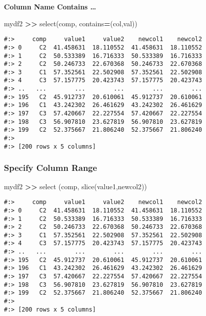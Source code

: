 \documentclass[
]{book}
\newenvironment{Shaded}{\begin{snugshade}}{\end{snugshade}}
\newcommand{\BuiltInTok}[1]{#1}
\newcommand{\NormalTok}[1]{#1}
\newcommand{\OperatorTok}[1]{\textcolor[rgb]{0.43,0.43,0.43}{\textbf{#1}}}
\newcommand{\StringTok}[1]{\textcolor[rgb]{0.5,0.5,0.5}{#1}}
\begin{document}
\textbf{Column Name Contains \ldots{}}

\begin{Shaded}
\begin{Highlighting}[]
\NormalTok{mydf2 }\OperatorTok{\textgreater{}\textgreater{}}\NormalTok{ select(}\StringTok{\textquotesingle{}comp\textquotesingle{}}\NormalTok{, contains}\OperatorTok{=}\NormalTok{(}\StringTok{\textquotesingle{}col\textquotesingle{}}\NormalTok{,}\StringTok{\textquotesingle{}val\textquotesingle{}}\NormalTok{))}
\end{Highlighting}
\end{Shaded}

\begin{verbatim}
#:>     comp     value1     value2    newcol1    newcol2
#:> 0     C2  41.458631  18.110552  41.458631  18.110552
#:> 1     C2  50.533389  16.716333  50.533389  16.716333
#:> 2     C2  50.246733  22.670368  50.246733  22.670368
#:> 3     C1  57.352561  22.502908  57.352561  22.502908
#:> 4     C3  57.157775  20.423743  57.157775  20.423743
#:> ..   ...        ...        ...        ...        ...
#:> 195   C2  45.912737  20.610061  45.912737  20.610061
#:> 196   C1  43.242302  26.461629  43.242302  26.461629
#:> 197   C3  57.420667  22.227554  57.420667  22.227554
#:> 198   C3  56.907810  23.627819  56.907810  23.627819
#:> 199   C2  52.375667  21.806240  52.375667  21.806240
#:> 
#:> [200 rows x 5 columns]
\end{verbatim}

\hypertarget{specify-column-range}{%
\subsubsection{Specify Column Range}\label{specify-column-range}}

\begin{Shaded}
\begin{Highlighting}[]
\NormalTok{mydf2 }\OperatorTok{\textgreater{}\textgreater{}}\NormalTok{ select (}\StringTok{\textquotesingle{}comp\textquotesingle{}}\NormalTok{, }\BuiltInTok{slice}\NormalTok{(}\StringTok{\textquotesingle{}value1\textquotesingle{}}\NormalTok{,}\StringTok{\textquotesingle{}newcol2\textquotesingle{}}\NormalTok{))}
\end{Highlighting}
\end{Shaded}

\begin{verbatim}
#:>     comp     value1     value2    newcol1    newcol2
#:> 0     C2  41.458631  18.110552  41.458631  18.110552
#:> 1     C2  50.533389  16.716333  50.533389  16.716333
#:> 2     C2  50.246733  22.670368  50.246733  22.670368
#:> 3     C1  57.352561  22.502908  57.352561  22.502908
#:> 4     C3  57.157775  20.423743  57.157775  20.423743
#:> ..   ...        ...        ...        ...        ...
#:> 195   C2  45.912737  20.610061  45.912737  20.610061
#:> 196   C1  43.242302  26.461629  43.242302  26.461629
#:> 197   C3  57.420667  22.227554  57.420667  22.227554
#:> 198   C3  56.907810  23.627819  56.907810  23.627819
#:> 199   C2  52.375667  21.806240  52.375667  21.806240
#:> 
#:> [200 rows x 5 columns]
\end{verbatim}
\end{document}
